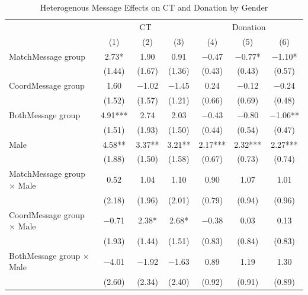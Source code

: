 \documentclass[12pt, a4paper]{article}
\begin{document}
\begin{table}[H]

\caption{\label{tab:lm-interaction-gender-test-donate}Heterogenous Message Effects on CT and Donation by Gender}
\centering
\fontsize{8}{10}\selectfont
\begin{threeparttable}
\begin{tabular}[t]{>{\raggedright\arraybackslash}p{30em}cccccc}
\toprule
\multicolumn{1}{c}{ } & \multicolumn{3}{c}{CT} & \multicolumn{3}{c}{Donation} \\
\cmidrule(l{3pt}r{3pt}){2-4} \cmidrule(l{3pt}r{3pt}){5-7}
  & (1) & (2) & (3) & (4) & (5) & (6)\\
\midrule
MatchMessage group & \num{2.73}* & \num{1.90} & \num{0.91} & \num{-0.47} & \num{-0.77}* & \num{-1.10}*\\
 & (\num{1.44}) & (\num{1.67}) & (\num{1.36}) & (\num{0.43}) & (\num{0.43}) & (\num{0.57})\\
CoordMessage group & \num{1.60} & \num{-1.02} & \num{-1.45} & \num{0.24} & \num{-0.12} & \num{-0.24}\\
 & (\num{1.52}) & (\num{1.57}) & (\num{1.21}) & (\num{0.66}) & (\num{0.69}) & (\num{0.48})\\
BothMessage group & \num{4.91}*** & \num{2.74} & \num{2.03} & \num{-0.43} & \num{-0.80} & \num{-1.06}**\\
 & (\num{1.51}) & (\num{1.93}) & (\num{1.50}) & (\num{0.44}) & (\num{0.54}) & (\num{0.47})\\
Male & \num{4.58}** & \num{3.37}** & \num{3.21}** & \num{2.17}*** & \num{2.32}*** & \num{2.27}***\\
 & (\num{1.88}) & (\num{1.50}) & (\num{1.58}) & (\num{0.67}) & (\num{0.73}) & (\num{0.74})\\
MatchMessage group $\times$ Male & \num{0.52} & \num{1.04} & \num{1.10} & \num{0.90} & \num{1.07} & \num{1.01}\\
 & (\num{2.18}) & (\num{1.96}) & (\num{2.01}) & (\num{0.79}) & (\num{0.94}) & (\num{0.96})\\
CoordMessage group $\times$ Male & \num{-0.71} & \num{2.38}* & \num{2.68}* & \num{-0.38} & \num{0.03} & \num{0.13}\\
 & (\num{1.93}) & (\num{1.44}) & (\num{1.51}) & (\num{0.83}) & (\num{0.84}) & (\num{0.83})\\
BothMessage group $\times$ Male & \num{-4.01} & \num{-1.92} & \num{-1.63} & \num{0.89} & \num{1.19} & \num{1.30}\\
 & (\num{2.60}) & (\num{2.34}) & (\num{2.40}) & (\num{0.92}) & (\num{0.91}) & (\num{0.89})\\

\end{tabular}
\end{threeparttable}
\end{table}
\end{document}
